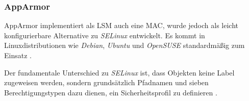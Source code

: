 \documentclass[../main.tex]{subfiles}
\begin{document}





      \subsubsection{AppArmor}
				AppArmor implementiert als LSM auch eine MAC, wurde jedoch als leicht konfigurierbare Alternative zu \emph{SELinux} entwickelt. Es kommt in Linuxdistributionen wie \emph{Debian}, \emph{Ubuntu} und \emph{OpenSUSE} standardmäßig zum Einsatz \cite{apparmorUbuntu}.



				Der fundamentale Unterschied zu \emph{SELinux} ist, dass Objekten keine Label zugeweisen werden, sondern grundsätzlich Pfadnamen und sieben Berechtigungstypen dazu dienen, ein Sicherheitsprofil zu definieren \cite{linuxSecOverview}\cite{apparmorQuickProfileLanguage}.

\end{document}
